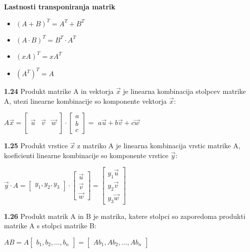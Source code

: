 \documentclass{article}
\begin{document}
\begin{multicols}{4}
	\textbf{Lastnosti transponiranja matrik}
	\begin{itemize}
		\item $(A + B)^{T} = A^{T} + B^{T}$
		\item $(A \cdot B)^{T} = B^{T} \cdot A^{T}$
		\item $(xA)^{T} = xA^{T}$
		\item $(A^{T})^{T} = A$
	\end{itemize}

	\textbf{1.24} Produkt matrike A in vektorja $\vec{x}$ je
	linearna kombinacija stolpcev matrike A, utezi linearne
	kombinacije so komponente vektorja $\vec{x}$:
	\begin{center}
		$A \vec{x} =
			\begin{bmatrix}
				        &         &         \\
				\vec{u} & \vec{v} & \vec{w} \\
				        &         &         \\
			\end{bmatrix}
			\cdot
			\begin{bmatrix}
				a \\
				b \\
				c
			\end{bmatrix} =$
		$a\vec{u} + b\vec{v} + c\vec{w}$
	\end{center}

	\textbf{1.25} Produkt vrstice $\vec{x}$ z matriko A je
	linearna kombinacija vrstic matrike A, koeficienti linearne
	kombinacije so komponente vrstice $\vec{y}$:
	\begin{center}
		$\vec{y} \cdot A =
			\begin{bmatrix}
				y_{1}, y_{2}, y_{3}
			\end{bmatrix} \cdot
			\begin{bmatrix}
				\vec{u} \\
				\vec{v} \\
				\vec{w}
			\end{bmatrix} =
			\begin{bmatrix}
				y_{1}\vec{u} \\
				y_{2}\vec{v} \\
				y_{3}\vec{w}
			\end{bmatrix}
		$
	\end{center}

	\textbf{1.26} Produkt matrik A in B je matrika, katere stolpci
	so zaporedoma produkti matrike A s stolpci matrike B:
	\begin{center}
		$AB = A
			\begin{bmatrix}
				b_{1}, b_{2}, \dots ,b_{n}
			\end{bmatrix} =
			\begin{bmatrix}
				Ab_{1}, Ab_{2}, \dots ,Ab_{n}
			\end{bmatrix}
		$
	\end{center}


\end{multicols}
\end{document}
